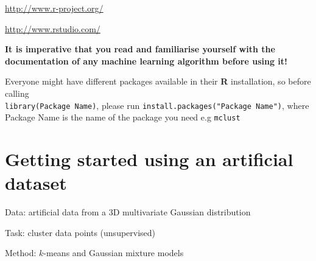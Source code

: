 \documentclass[a4paper,11pt]{article}
\begin{document}
\begin{description}[leftmargin=11em,style=nextline]
	\item[Installing R:] \url{http://www.r-project.org/} 
	\item[Installing RStudio:] \url{http://www.rstudio.com/}
\end{description}  

\begin{framed}
\textbf{It is imperative that you read and familiarise yourself with the documentation of 
any machine learning algorithm before using it!} 
\end{framed}

Everyone might have different packages available in their \textbf{R} installation, so
before calling\\ 
{\lstinline[style=RCode, basicstyle=\normalsize\ttfamily] |library(Package Name)|}, please run
{\lstinline[style=RCode, basicstyle=\normalsize\ttfamily] |install.packages("Package Name")|}, where
Package Name is the name of the package you need e.g {\lstinline[style=RCode, basicstyle=\normalsize\ttfamily] |mclust|}

\clearpage
\section{Getting started using an artificial dataset}
\begin{framed}
\begin{description}[leftmargin=5em,style=nextline]\addtolength{\itemsep}{-0.2\baselineskip}
	\item[Data:] artificial data from a 3D multivariate Gaussian distribution
	\item[Task:] cluster data points (unsupervised)
	\item[Method:] $k$-means and Gaussian mixture models
\end{description} 
\end{framed}
\end{document}
